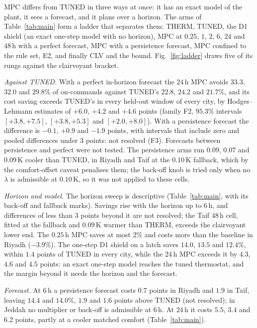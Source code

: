\documentclass[3p,twocolumn,number]{elsarticle}
\begin{document}
MPC differs from TUNED in three ways at once: it has an exact model of the plant, it sees a forecast, and it plans over a horizon. The arms of Table~\ref{tab:main} form a ladder that separates them: THERM, TUNED, the D1 shield (an exact one-step model with no horizon), MPC at $0.25$, $1$, $2$, $6$, $24$ and $48\,$h with a perfect forecast, MPC with a persistence forecast, MPC confined to the rule set, E2, and finally CLV and the bound. Fig.~\ref{fig:ladder} draws five of its rungs against the clairvoyant bracket.



\emph{Against TUNED.} With a perfect in-horizon forecast the $24\,$h MPC avoids $33.3$, $32.0$ and $29.8\%$ of on-commands against TUNED's $22.8$, $24.2$ and $21.7\%$, and its cost saving exceeds TUNED's in every held-out window of every city, by Hodges--Lehmann estimates of $+6.0$, $+4.2$ and $+4.6$ points (family F2, $95.3\%$ intervals $[+3.8,+7.5]$, $[+3.8,+5.3]$ and $[+2.0,+8.0]$). With a persistence forecast the difference is $-0.1$, $+0.9$ and $-1.9$ points, with intervals that include zero and pooled differences under $3$ points: not resolved (F3). Forecasts between persistence and perfect were not tested. The persistence arms run $0.09$, $0.07$ and $0.09\,$K cooler than TUNED, in Riyadh and Taif at the $0.10\,$K fallback, which by the comfort-offset caveat penalises them; the back-off knob is tried only when no $\lambda$ is admissible at $0.10\,$K, so it was not applied to these cells.

\emph{Horizon and model.} The horizon sweep is descriptive (Table~\ref{tab:main}, with its back-off and fallback marks). Savings rise with the horizon up to $6\,$h, and differences of less than $3$ points beyond it are not resolved; the Taif $48\,$h cell, fitted at the fallback and $0.09\,$K warmer than THERM, exceeds the clairvoyant lower end. The $0.25\,$h MPC saves at most $2\%$ and costs more than the baseline in Riyadh ($-3.9\%$). The one-step D1 shield on a latch saves $14.0$, $13.5$ and $12.4\%$, within $1.4$ points of TUNED in every city, while the $24\,$h MPC exceeds it by $4.3$, $4.6$ and $4.5$ points: an exact one-step model reaches the tuned thermostat, and the margin beyond it needs the horizon and the forecast.

\emph{Forecast.} At $6\,$h a persistence forecast costs $0.7$ points in Riyadh and $1.9$ in Taif, leaving $14.4$ and $14.0\%$, $1.9$ and $1.6$ points above TUNED (not resolved); in Jeddah no multiplier or back-off is admissible at $6\,$h. At $24\,$h it costs $5.5$, $3.4$ and $6.2$ points, partly at a cooler matched comfort (Table~\ref{tab:main}).
\end{document}
